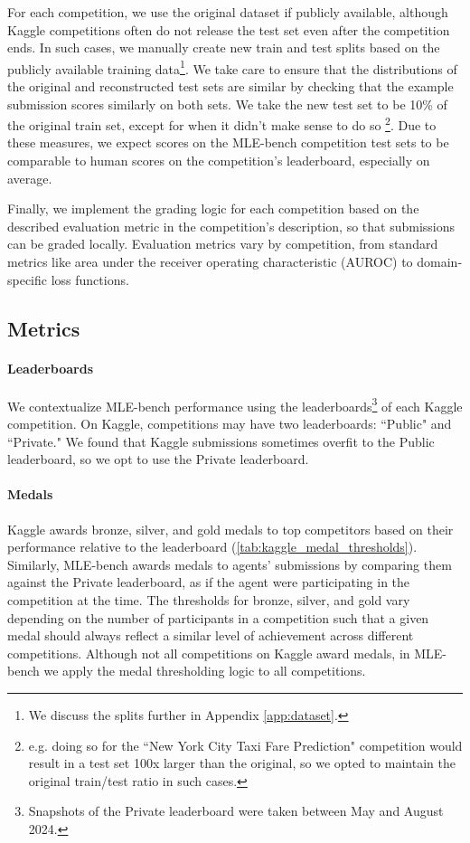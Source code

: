 \documentclass{article} %
\begin{document}
For each competition, we use the original dataset if publicly available, although Kaggle competitions often do not release the test set even after the competition ends. In such cases, we manually create new train and test splits based on the publicly available training data\footnote{We discuss the splits further in Appendix \ref{app:dataset}.}. We take care to ensure that the distributions of the original and reconstructed test sets are similar by checking that the example submission scores similarly on both sets. We take the new test set to be 10\% of the original train set, except for when it didn't make sense to do so \footnote{e.g. doing so for the ``New York City Taxi Fare Prediction" competition would result in a test set 100x larger than the original, so we opted to maintain the original train/test ratio in such cases.}. Due to these measures, we expect scores on the MLE-bench competition test sets to be comparable to human scores on the competition’s leaderboard, especially on average.

Finally, we implement the grading logic for each competition based on the described evaluation metric in the competition's description, so that submissions can be graded locally. Evaluation metrics vary by competition, from standard metrics like area under the receiver operating characteristic (AUROC) to domain-specific loss functions.

\subsection{Metrics}

\paragraph{Leaderboards}
We contextualize MLE-bench performance using the leaderboards\footnote{Snapshots of the Private leaderboard were taken between May and August 2024.} of each Kaggle competition. On Kaggle, competitions may have two leaderboards: ``Public" and ``Private." We found that Kaggle submissions sometimes overfit to the Public leaderboard, so we opt to use the Private leaderboard.

\paragraph{Medals}
Kaggle awards bronze, silver, and gold medals to top competitors based on their performance relative to the leaderboard (\autoref{tab:kaggle_medal_thresholds}).  Similarly, MLE-bench awards medals to agents’ submissions by comparing them against the Private leaderboard, as if the agent were participating in the competition at the time. The thresholds for bronze, silver, and gold vary depending on the number of participants in a competition such that a given medal should always reflect a similar level of achievement across different competitions. Although not all competitions on Kaggle award medals, in MLE-bench we apply the medal thresholding logic to all competitions.
\end{document}
